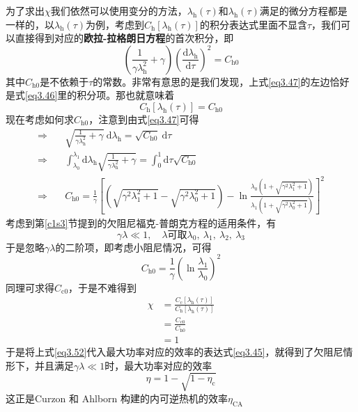 为了求出$\chi$我们依然可以使用变分的方法，$\lambda_{\mathrm{h}}(\tau)$和$\lambda_{\mathrm{h}}(\tau)$满足的微分方程都是一样的，以$\lambda_{\mathrm{h}}(\tau)$为例，考虑到$C_{\mathrm{h}} [\lambda_{\mathrm{h}}(\tau)]$的积分表达式里面不显含$\tau$，我们可以直接得到对应的\textbf{欧拉-拉格朗日方程}的首次积分\cite{Wu2003}，即
\begin{equation}
    \left(\frac{1}{\gamma \lambda_{\mathrm{h}}^{2}}+\gamma\right)\left(\frac{\mathrm{d} \lambda_{\mathrm{h}}}{\mathrm{d} \tau}\right)^{2}=C_{\mathrm{h0}}
    \label{eq3.47}
\end{equation}
其中$C_{\mathrm{h0}}$是不依赖于$\tau$的常数。非常有意思的是我们发现，上式\eqref{eq3.47}的左边恰好是式\eqref{eq3.46}里的积分项。那也就意味着
\begin{equation}
    C_{\mathrm{h}} [\lambda_{\mathrm{h}}(\tau)]=C_{\mathrm{h0}}
    \label{eq3.49}
\end{equation}
现在考虑如何求$C_{\mathrm{h0}}$，注意到由式\eqref{eq3.47}可得
\begin{align}
    \Rightarrow \quad &\sqrt{\frac{1}{\gamma \lambda_{\mathrm{h}}^2}+\gamma} \ \mathrm{d} \lambda_{\mathrm{h}}=\sqrt{C_{\mathrm{h0}}} \ \mathrm{d} \tau\\
    \Rightarrow \quad& \int_{\lambda_0}^{\lambda_1} \mathrm{d}  \lambda_{\mathrm{h}} \sqrt{\frac{1}{\gamma \lambda_{\mathrm{h}}^2}+\gamma}=\int_{0}^{1} \mathrm{d} \tau \sqrt{C_{\mathrm{h0}}}\\
    \Rightarrow \quad& C_{\mathrm{h0}} =\frac{1}{\gamma} \left[\left(\sqrt{\gamma^{2} \lambda_{1} ^{2}+1}-\sqrt{\gamma^{2} \lambda_{0} ^{2}+1}\right)-\ln \frac{\lambda_{0}\left(1+\sqrt{\gamma^{2} \lambda_{1} ^{2}+1}\right) }{\lambda_{1} \left(1+\sqrt{\gamma^{2} \lambda_{0} ^{2}+1}\right)}\right]^2 
    \label{eq3.50}
\end{align}
考虑到第\ref{c1s3}节提到的欠阻尼福克-普朗克方程的适用条件\cite{Sekimoto2010}，有
\begin{equation}
    \gamma \lambda \ll 1,\quad \lambda \text{可取}\lambda_0,\ \lambda_1,\ \lambda_2,\ \lambda_3
    \label{eq3.51}
\end{equation}
于是忽略$\gamma \lambda$的二阶项，即考虑小阻尼情况，可得
\begin{equation}
    C_{\mathrm{h0}}=\frac{1}{\gamma}\left(\ln \frac{\lambda_{1}}{\lambda_{0}}\right)^2
    \label{eq3.51}
\end{equation}
同理可求得$C_{\mathrm{c0}}$，于是不难得到
\begin{equation}
    \begin{split}
        \chi&=\frac{C_{\mathrm{c}} [\lambda_{\mathrm{h}}(\tau)]}{C_{\mathrm{h}} [\lambda_{\mathrm{h}}(\tau)]}\\
        &=\frac{C_{\mathrm{c0}}}{C_{\mathrm{h0}}}\\
        &=1
    \end{split}
    \label{eq3.52}
\end{equation}
于是将上式\eqref{eq3.52}代入最大功率对应的效率的表达式\eqref{eq3.45}，就得到了欠阻尼情形下，并且满足$\gamma \lambda \ll 1$时，最大功率对应的效率
\begin{equation}
    \eta=1-\sqrt{1-\eta_{\mathrm{c}}}
    \label{eq3.53}
\end{equation}
这正是Curzon 和 Ahlborn 构建的内可逆热机\cite{Curzon1975}的效率$\eta_{\mathrm{CA}}$
